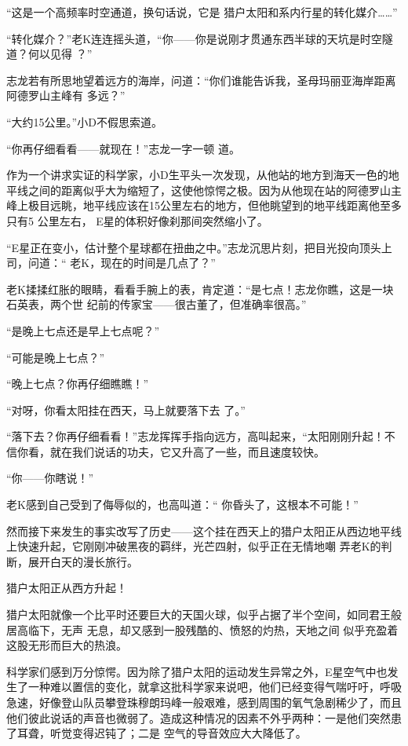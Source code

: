 \documentclass{article}
\begin{document}
“这是一个高频率时空通道，换句话说，它是
猎户太阳和系内行星的转化媒介……” 

“转化媒介？”老K连连摇头道，“你——你是说刚才贯通东西半球的天坑是时空隧道？何以见得
？” 

志龙若有所思地望着远方的海岸，问道：“你们谁能告诉我，圣母玛丽亚海岸距离阿德罗山主峰有
多远？” 


“大约15公里。”小D不假思索道。 

“你再仔细看看——就现在！”志龙一字一顿
道。 

\newpage

作为一个讲求实证的科学家，小D生平头一次发现，从他站的地方到海天一色的地平线之间的距离似乎大为缩短了，这使他惊愕之极。因为从他现在站的阿德罗山主峰上极目远眺，地平线应该在15公里左右的地方，但他眺望到的地平线距离他至多只有5
公里左右， E星的体积好像刹那间突然缩小了。 

“E星正在变小，估计整个星球都在扭曲之中。”志龙沉思片刻，把目光投向顶头上司，问道：“
老K，现在的时间是几点了？” 

老K揉揉红胀的眼睛，看看手腕上的表，肯定道：“是七点！志龙你瞧，这是一块石英表，两个世
纪前的传家宝——很古董了，但准确率很高。” 


“是晚上七点还是早上七点呢？” 


“可能是晚上七点？” 


“晚上七点？你再仔细瞧瞧！” 

\newpage

“对呀，你看太阳挂在西天，马上就要落下去
了。” 

“落下去？你再仔细看看！”志龙挥挥手指向远方，高叫起来，“太阳刚刚升起！不信你看，就在我们说话的功夫，它又升高了一些，而且速度较快。


“你——你瞎说！” 

老K感到自己受到了侮辱似的，也高叫道：“
你昏头了，这根本不可能！” 

然而接下来发生的事实改写了历史——这个挂在西天上的猎户太阳正从西边地平线上快速升起，它刚刚冲破黑夜的羁绊，光芒四射，似乎正在无情地嘲
弄老K的判断，展开白天的漫长旅行。 


猎户太阳正从西方升起！ 

猎户太阳就像一个比平时还要巨大的天国火球，似乎占据了半个空间，如同君王般居高临下，无声
\newpage
无息，却又感到一股残酷的、愤怒的灼热，天地之间
似乎充盈着这股无形而巨大的热浪。 

科学家们感到万分惊愕。因为除了猎户太阳的运动发生异常之外，E星空气中也发生了一种难以置信的变化，就拿这批科学家来说吧，他们已经变得气喘吁吁，呼吸急速，好像登山队员攀登珠穆朗玛峰一般艰难，感到周围的氧气急剧稀少了，而且他们彼此说话的声音也微弱了。造成这种情况的因素不外乎两种：一是他们突然患了耳聋，听觉变得迟钝了；二是
空气的导音效应大大降低了。 
\end{document}
